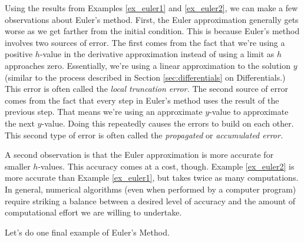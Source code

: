 Using the results from Examples \ref{ex_euler1} and \ref{ex_euler2}, we can make a few observations about Euler's method.  First, the Euler approximation generally gets worse as we get farther from the initial condition.  This is because Euler's method involves two sources of error.  The first comes from the fact that we're using a positive $h$-value in the derivative approximation instead of using a limit as $h$ approaches zero.  Essentially, we're using a linear approximation to the solution $y$ (similar to the process described in Section \ref{sec:differentials} on Differentials.) This error is often called the \emph{local truncation error.}  The second source of error comes from the fact that every step in Euler's method uses the result of the previous step.  That means we're using an approximate $y$-value to approximate the next $y$-value.  Doing this repeatedly causes the errors to build on each other.  This second type of error is often called the \emph{propagated} or \emph{accumulated error.} 

A second observation is that the Euler approximation is more accurate for smaller $h$-values.  This accuracy comes at a cost, though.  Example \ref{ex_euler2} is more accurate than Example \ref{ex_euler1}, but takes twice as many computations.  In general, numerical algorithms (even when performed by a computer program) require striking a balance between a desired level of accuracy and the amount of computational effort we are willing to undertake.

Let's do one final example of Euler's Method.\\

